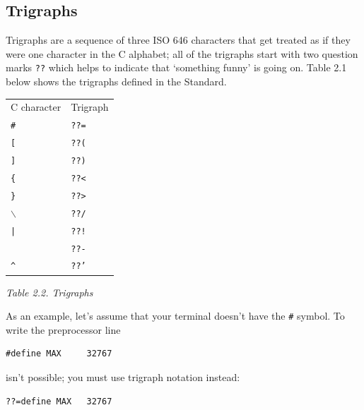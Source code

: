   

  \subsection{Trigraphs}
   

   Trigraphs are a sequence of three ISO 646 characters that get
    treated as if they were one character in the C alphabet; all of the
    trigraphs start with two question marks \texttt{??} which helps
    to indicate that `something funny' is going on. Table 2.1 below shows the trigraphs defined in the Standard.


   \begin{tabular}{lp{\textwidth}}
     C character & Trigraph
    \\

     \texttt{\#} & \texttt{??=}
    \\

     \texttt{[} & \texttt{??(}
    \\

     \texttt{]} & \texttt{??)}
    \\

     \texttt{\{} & \texttt{??<}
    \\

     \texttt{\}} & \texttt{??>}
    \\

     \texttt{$\backslash$} & \texttt{??/}
    \\

     \texttt{|} & \texttt{??!}
    \\

     \texttt{~} & \texttt{??-}
    \\

     \texttt{\^} & \texttt{??'}
    \\
\end{tabular}

\begin{center}\textit{Table 2.2. Trigraphs}\end{center}


   As an example, let's assume that your terminal doesn't have the
    \texttt{\#} symbol. To write the preprocessor line


   \begin{Verbatim}
#define MAX     32767
\end{Verbatim}

   isn't possible; you must use trigraph notation instead:


   \begin{Verbatim}
??=define MAX   32767
\end{Verbatim}

